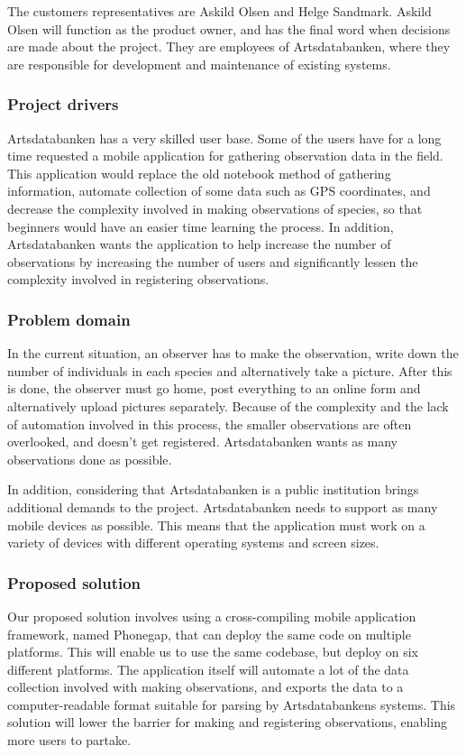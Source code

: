 The customers representatives are Askild Olsen and Helge Sandmark. Askild Olsen
will function as the product owner, and has the final word when decisions are
made about the project. They are employees of Artsdatabanken, where they are
responsible for development and maintenance of existing systems.

\subsubsection{Project drivers}
Artsdatabanken has a very skilled user base. Some of the users have for a long
time requested a mobile application for gathering observation data in the
field. This application would replace the old notebook method of gathering
information, automate collection of some data such as GPS coordinates, and
decrease the complexity involved in making observations of species, so that
beginners would have an easier time learning the process. In addition,
Artsdatabanken wants the application to help increase the number of
observations by increasing the number of users and significantly lessen the
complexity involved in registering observations.

\subsubsection{Problem domain}
In the current situation, an observer has to make the observation, write down
the number of individuals in each species and alternatively take a picture. After this is done,
the observer must go home, post everything to an online form and
alternatively upload pictures separately. Because of the complexity and the
lack of automation involved in this process, the smaller observations are often
overlooked, and doesn't get registered. Artsdatabanken wants as many
observations done as possible.

In addition, considering that Artsdatabanken is a public institution brings
additional demands to the project. Artsdatabanken needs to support as many
mobile devices as possible. This means that the application must work on
a variety of devices with different operating systems and screen sizes.

\subsubsection{Proposed solution}
Our proposed solution involves using a cross-compiling mobile application
framework, named Phonegap, that can deploy the same code on multiple platforms.
This will enable us to use the same codebase, but deploy on six different
platforms. The application itself will automate a lot of the data collection
involved with making observations, and exports the data to a computer-readable
format suitable for parsing by Artsdatabankens systems. This solution will
lower the barrier for making and registering observations, enabling more users
to partake.

